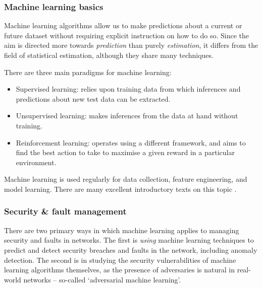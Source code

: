 \subsubsection{Machine learning basics}

Machine learning algorithms allow us to make predictions about a current or future dataset without requiring explicit instruction on how to do so. Since the aim is directed more towards \textit{prediction} than purely \textit{estimation}, it differs from the field of statistical estimation, although they share many techniques.

There are three main paradigms for machine learning:
\begin{itemize}
	\item Supervised learning: relies upon training data from which inferences and predictions about new test data can be extracted.
	\item Unsupervised learning: makes inferences from the data at hand without training.
	\item Reinforcement learning: operates using a different framework, and aims to find the best action to take to maximise a given reward in a particular environment.
\end{itemize}

Machine learning is used regularly for data collection, feature engineering, and model learning. There are many excellent introductory texts on this topic \cite{bib:bishop2006pattern, bib:shalev2014understanding, bib:trevor2009elements, bib:marsland2011machine, bib:flach2012machine}.

\subsubsection{Security \& fault management}

There are two primary ways in which machine learning applies to managing security and faults in networks. The first is \textit{using} machine learning techniques to predict and detect security breaches and faults in the network, including anomaly detection. The second is in studying the security vulnerabilities of machine learning algorithms themselves, as the presence of adversaries is natural in real-world networks -- so-called `adversarial machine learning'.

